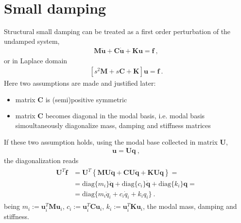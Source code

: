 \documentclass[letterpaper,10pt,english]{jupyterBook}
\begin{document}
\section{Small damping}
\label{\detokenize{ch/solids/structural-damping:small-damping}}
\sphinxAtStartPar
Structural small damping can be treated as a first order perturbation of the undamped system,
\begin{equation*}
\begin{split}\mathbf{M} \ddot{\mathbf{u}} + \mathbf{C} \dot{\mathbf{u}} + \mathbf{K} \mathbf{u} = \mathbf{f} \ ,\end{split}
\end{equation*}
\sphinxAtStartPar
or in Laplace domain
\begin{equation*}
\begin{split}\left[ s^2 \mathbf{M} + s \mathbf{C} + \mathbf{K} \right] \mathbf{u} = \mathbf{f} \ .\end{split}
\end{equation*}
\sphinxAtStartPar
Here two assumptions are made and justified later:
\begin{itemize}
\item {} 
\sphinxAtStartPar
matrix \(\mathbf{C}\) is (semi)positive symmetric

\item {} 
\sphinxAtStartPar
matrix \(\mathbf{C}\) becomes diagonal in the modal basis, i.e. modal basis simoultaneously diagonalize mass, damping and stiffness matrices

\end{itemize}

\sphinxAtStartPar
If these two assumption holds, using the modal base collected in matrix \(\mathbf{U}\),
\begin{equation*}
\begin{split}\mathbf{u} = \mathbf{U} \mathbf{q} \ ,\end{split}
\end{equation*}
\sphinxAtStartPar
the diagonalization reads
\begin{equation*}
\begin{split}\begin{aligned}
\mathbf{U}^T \mathbf{f}
& = \mathbf{U}^T \left\{ \mathbf{M} \mathbf{U} \ddot{\mathbf{q}} + \mathbf{C} \mathbf{U} \dot{\mathbf{q}} + \mathbf{K} \mathbf{U} \mathbf{q} \right\} = \\
& = \text{diag} \{ m_i \} \ddot{\mathbf{q}} + \text{diag}\{ c_i \} \dot{\mathbf{q}} + \text{diag}\{ k_i \} \mathbf{q} = \\
& = \text{diag} \{ m_i \ddot{q}_i + c_i \dot{q}_i + k_i q_i \} \ .
\end{aligned}\end{split}
\end{equation*}
\sphinxAtStartPar
being \(m_i := \mathbf{u}_i^T \mathbf{M} \mathbf{u}_i\), \(c_i := \mathbf{u}_i^T \mathbf{C} \mathbf{u}_i\), \(k_i := \mathbf{u}_i^T \mathbf{K} \mathbf{u}_i\), the modal mass, damping and stiffness.
\end{document}
